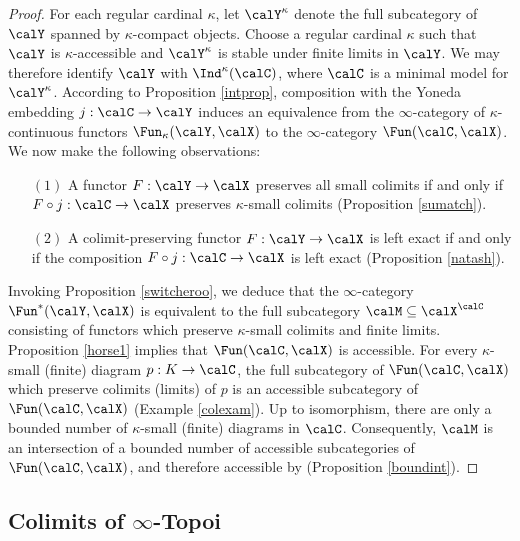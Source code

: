 \begin{proof}
For each regular cardinal $\kappa$, let $\calY^{\kappa}$ denote the full subcategory of
$\calY$ spanned by $\kappa$-compact objects. Choose a regular cardinal $\kappa$ such that $\calY$ is $\kappa$-accessible and $\calY^{\kappa}$ is stable under finite limits in $\calY$. We may therefore identify $\calY$ with $\Ind^{\kappa}(\calC)$, where
$\calC$ is a minimal model for $\calY^{\kappa}$. According to Proposition \ref{intprop},
composition with the Yoneda embedding $j: \calC \rightarrow \calY$ induces an equivalence
from the $\infty$-category of $\kappa$-continuous functors $\Fun_{\kappa}(\calY,\calX)$
to the $\infty$-category $\Fun(\calC,\calX)$. We now make the following observations:

\begin{itemize}
\item[$(1)$] A functor $F: \calY \rightarrow \calX$ preserves all small colimits if and only if
$F \circ j: \calC \rightarrow \calX$ preserves $\kappa$-small colimits (Proposition \ref{sumatch}).

\item[$(2)$] A colimit-preserving functor $F: \calY \rightarrow \calX$ is left exact if and only if the composition $F \circ j: \calC \rightarrow \calX$ is left exact (Proposition \ref{natash}). 

\end{itemize}

Invoking Proposition \ref{switcheroo}, we deduce that the $\infty$-category $\Fun^{\ast}(\calY, \calX)$ is equivalent to the full subcategory $\calM \subseteq \calX^{\calC}$ consisting of functors which preserve $\kappa$-small colimits and finite limits. Proposition \ref{horse1} implies that $\Fun(\calC,\calX)$ is accessible. For every $\kappa$-small (finite) diagram $p: K \rightarrow \calC$, the full subcategory of $\Fun(\calC,\calX)$ which
preserve colimits (limits) of $p$ is an accessible subcategory of $\Fun(\calC,\calX)$
(Example \ref{colexam}). Up to isomorphism, there are only a bounded number of $\kappa$-small (finite) diagrams in $\calC$. Consequently, $\calM$ is an intersection of a bounded number of accessible subcategories of $\Fun(\calC,\calX)$, and therefore accessible by (Proposition \ref{boundint}).
\end{proof}

\subsection{Colimits of $\infty$-Topoi}\label{colimtop}

